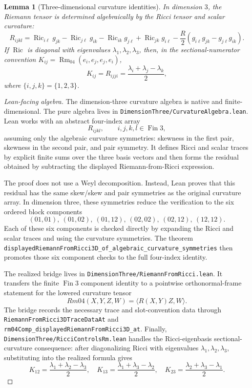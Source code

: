 \documentclass[11pt]{article}
\theoremstyle{plain}
\newtheorem{lemma}[theorem]{Lemma}
\theoremstyle{definition}
\theoremstyle{remark}
\newcommand{\Ric}{\operatorname{Ric}}
\newcommand{\Rm}{\operatorname{Rm}}
\newcommand{\leanref}[1]{\nolinkurl{#1}}
\newcommand{\leanfile}[1]{\nolinkurl{#1}}
\newcommand{\rffile}[1]{\leanfile{#1}}
\begin{document}
\begin{lemma}[Three-dimensional curvature identities]
\label{lem:3d-curvature-identities}
In dimension $3$, the Riemann tensor is determined algebraically by the Ricci
tensor and scalar curvature:
\[
R_{ijkl}
=
\Ric_{i\ell}g_{jk}-\Ric_{j\ell}g_{ik}
-\Ric_{ik}g_{j\ell}+\Ric_{jk}g_{i\ell}
-\frac R2\left(g_{i\ell}g_{jk}-g_{j\ell}g_{ik}\right).
\]
If $\Ric$ is diagonal with eigenvalues $\lambda_1,\lambda_2,\lambda_3$, then, in
the sectional-numerator convention $K_{ij}=\Rm_{04}(e_i,e_j,e_j,e_i)$,
\[
K_{ij}=R_{ijji}=\frac{\lambda_i+\lambda_j-\lambda_k}{2},
\]
where $\{i,j,k\}=\{1,2,3\}$.
\end{lemma}

\begin{proof}[Lean-facing algebra]
The dimension-three curvature algebra is native and finite-dimensional.  The
pure algebra lives in \rffile{DimensionThree/CurvatureAlgebra.lean}.  Lean
works with an abstract four-index array
\[
  R_{ijkl},\qquad i,j,k,l\in \operatorname{Fin} 3,
\]
assuming only the algebraic curvature symmetries: skewness in the first pair,
skewness in the second pair, and pair symmetry.  It defines Ricci and scalar
traces by explicit finite sums over the three basis vectors and then forms the
residual obtained by subtracting the displayed Riemann-from-Ricci expression.

The proof does not use a Weyl decomposition.  Instead, Lean proves that this
residual has the same skew/skew and pair symmetries as the original curvature
array.  In dimension three, these symmetries reduce the verification to the six
ordered block components
\[
  (01,01),\ (01,02),\ (01,12),\ (02,02),\ (02,12),\ (12,12).
\]
Each of these six components is checked directly by expanding the Ricci and
scalar traces and using the curvature symmetries.  The theorem
\leanref{displayedRiemannFromRicci3D_of_algebraic_curvature_symmetries}
then promotes those six component checks to the full four-index identity.

The realized bridge lives in \rffile{DimensionThree/RiemannFromRicci.lean}.  It
transfers the finite \(\operatorname{Fin} 3\) component identity to a pointwise
orthonormal-frame statement for the lowered curvature tensor
\[
  Rm04(X,Y,Z,W)=\langle R(X,Y)Z,W\rangle .
\]
The bridge records the necessary trace and slot-convention data through
\leanref{RiemannFromRicci3DTraceDataAt} and
\leanref{rm04Comp_displayedRiemannFromRicci3D_at}.  Finally,
\rffile{DimensionThree/RicciControlsRm.lean} handles the Ricci-eigenbasis
sectional-curvature consequence: after diagonalizing Ricci with eigenvalues
\(\lambda_1,\lambda_2,\lambda_3\), substituting into the realized formula gives
\[
  K_{12}=\frac{\lambda_1+\lambda_2-\lambda_3}{2},
  \quad
  K_{13}=\frac{\lambda_1+\lambda_3-\lambda_2}{2},
  \quad
  K_{23}=\frac{\lambda_2+\lambda_3-\lambda_1}{2}.
\]
\end{proof}
\end{document}
